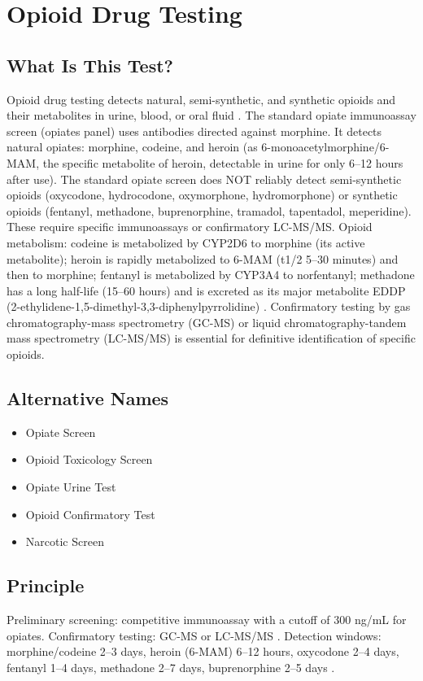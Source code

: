 \chapter{Opioid Drug Testing}
\section*{What Is This Test?}
Opioid drug testing detects natural, semi-synthetic, and synthetic opioids and their metabolites in urine, blood, or oral fluid \cite{cone2001alternate}. The standard opiate immunoassay screen (opiates panel) uses antibodies directed against morphine. It detects natural opiates: morphine, codeine, and heroin (as 6-monoacetylmorphine/6-MAM, the specific metabolite of heroin, detectable in urine for only 6--12 hours after use). The standard opiate screen does NOT reliably detect semi-synthetic opioids (oxycodone, hydrocodone, oxymorphone, hydromorphone) or synthetic opioids (fentanyl, methadone, buprenorphine, tramadol, tapentadol, meperidine). These require specific immunoassays or confirmatory LC-MS/MS. Opioid metabolism: codeine is metabolized by CYP2D6 to morphine (its active metabolite); heroin is rapidly metabolized to 6-MAM (t1/2 5--30 minutes) and then to morphine; fentanyl is metabolized by CYP3A4 to norfentanyl; methadone has a long half-life (15--60 hours) and is excreted as its major metabolite EDDP (2-ethylidene-1,5-dimethyl-3,3-diphenylpyrrolidine) \cite{trescot2008opioid}. Confirmatory testing by gas chromatography-mass spectrometry (GC-MS) or liquid chromatography-tandem mass spectrometry (LC-MS/MS) is essential for definitive identification of specific opioids.
\section*{Alternative Names}
\begin{itemize}
  \item Opiate Screen
  \item Opioid Toxicology Screen
  \item Opiate Urine Test
  \item Opioid Confirmatory Test
  \item Narcotic Screen
\end{itemize}
\section*{Principle}
Preliminary screening: competitive immunoassay with a cutoff of 300 ng/mL for opiates. Confirmatory testing: GC-MS or LC-MS/MS \cite{tietz2012textbook}. Detection windows: morphine/codeine 2--3 days, heroin (6-MAM) 6--12 hours, oxycodone 2--4 days, fentanyl 1--4 days, methadone 2--7 days, buprenorphine 2--5 days \cite{moeller2008urine}.
